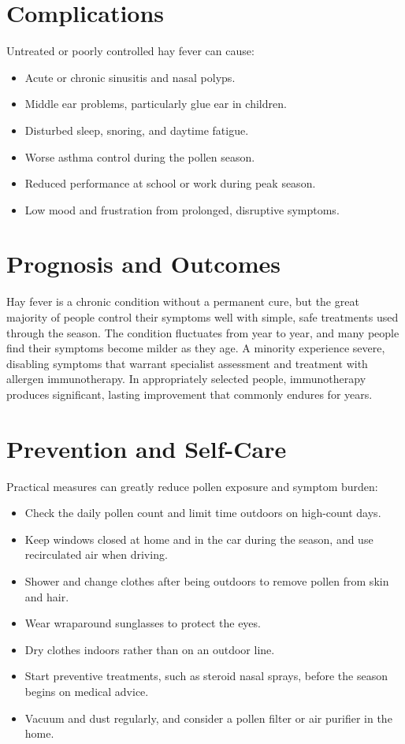\section*{Complications}
Untreated or poorly controlled hay fever can cause:

\begin{itemize}
    \item Acute or chronic sinusitis and nasal polyps.
    \item Middle ear problems, particularly glue ear in children.
    \item Disturbed sleep, snoring, and daytime fatigue.
    \item Worse asthma control during the pollen season.
    \item Reduced performance at school or work during peak season.
    \item Low mood and frustration from prolonged, disruptive symptoms.
\end{itemize}

\section*{Prognosis and Outcomes}
Hay fever is a chronic condition without a permanent cure, but the great majority of people control their symptoms well with simple, safe treatments used through the season. The condition fluctuates from year to year, and many people find their symptoms become milder as they age. A minority experience severe, disabling symptoms that warrant specialist assessment and treatment with allergen immunotherapy. In appropriately selected people, immunotherapy produces significant, lasting improvement that commonly endures for years.

\section*{Prevention and Self-Care}
Practical measures can greatly reduce pollen exposure and symptom burden:

\begin{itemize}
    \item Check the daily pollen count and limit time outdoors on high-count days.
    \item Keep windows closed at home and in the car during the season, and use recirculated air when driving.
    \item Shower and change clothes after being outdoors to remove pollen from skin and hair.
    \item Wear wraparound sunglasses to protect the eyes.
    \item Dry clothes indoors rather than on an outdoor line.
    \item Start preventive treatments, such as steroid nasal sprays, before the season begins on medical advice.
    \item Vacuum and dust regularly, and consider a pollen filter or air purifier in the home.
\end{itemize}

